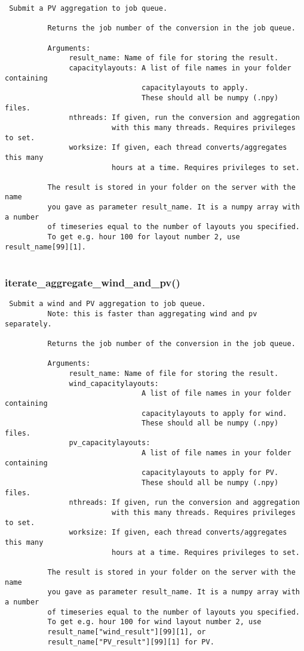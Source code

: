 \begin{verbatim}
 Submit a PV aggregation to job queue.

          Returns the job number of the conversion in the job queue.

          Arguments:
               result_name: Name of file for storing the result.
               capacitylayouts: A list of file names in your folder containing
                                capacitylayouts to apply.
                                These should all be numpy (.npy) files.
               nthreads: If given, run the conversion and aggregation
                         with this many threads. Requires privileges to set.
               worksize: If given, each thread converts/aggregates this many
                         hours at a time. Requires privileges to set.

          The result is stored in your folder on the server with the name
          you gave as parameter result_name. It is a numpy array with a number
          of timeseries equal to the number of layouts you specified.
          To get e.g. hour 100 for layout number 2, use result_name[99][1]. 
          
\end{verbatim}
\subsubsection{iterate\_aggregate\_wind\_and\_pv()}


\begin{verbatim}
 Submit a wind and PV aggregation to job queue.
          Note: this is faster than aggregating wind and pv separately.

          Returns the job number of the conversion in the job queue.

          Arguments:
               result_name: Name of file for storing the result.
               wind_capacitylayouts:
                                A list of file names in your folder containing
                                capacitylayouts to apply for wind.
                                These should all be numpy (.npy) files.
               pv_capacitylayouts:
                                A list of file names in your folder containing
                                capacitylayouts to apply for PV.
                                These should all be numpy (.npy) files.
               nthreads: If given, run the conversion and aggregation
                         with this many threads. Requires privileges to set.
               worksize: If given, each thread converts/aggregates this many
                         hours at a time. Requires privileges to set.

          The result is stored in your folder on the server with the name
          you gave as parameter result_name. It is a numpy array with a number
          of timeseries equal to the number of layouts you specified.
          To get e.g. hour 100 for wind layout number 2, use
          result_name["wind_result"][99][1], or 
          result_name["PV_result"][99][1] for PV.
          
\end{verbatim}
